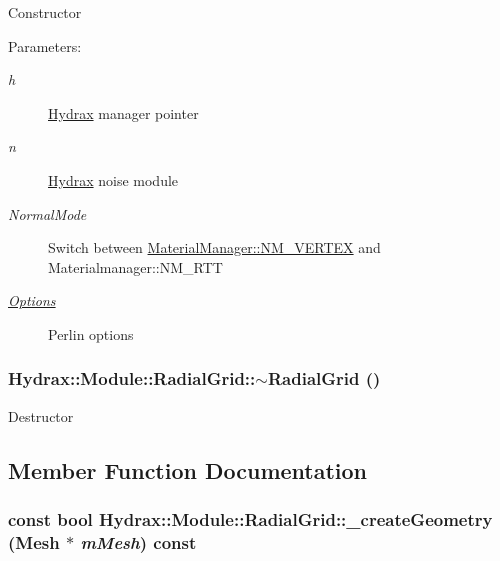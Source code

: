 Constructor \begin{Desc}
\item[Parameters:]
\begin{description}
\item[{\em h}]\hyperlink{class_hydrax_1_1_hydrax}{Hydrax} manager pointer \item[{\em n}]\hyperlink{class_hydrax_1_1_hydrax}{Hydrax} noise module \item[{\em NormalMode}]Switch between \hyperlink{class_hydrax_1_1_material_manager_aa14689cd1c259f48954dfecda9b296ffe4d6257f673cf503a9905fb2576288f}{MaterialManager::NM\_\-VERTEX} and Materialmanager::NM\_\-RTT \item[{\em \hyperlink{struct_hydrax_1_1_module_1_1_radial_grid_1_1_options}{Options}}]Perlin options \end{description}
\end{Desc}
\hypertarget{class_hydrax_1_1_module_1_1_radial_grid_f8caf3997cfc178019db4ac735394b7c}{
\subsubsection[{$\sim$RadialGrid}]{\setlength{\rightskip}{0pt plus 5cm}Hydrax::Module::RadialGrid::$\sim$RadialGrid ()}}
\label{class_hydrax_1_1_module_1_1_radial_grid_f8caf3997cfc178019db4ac735394b7c}


Destructor 

\subsection{Member Function Documentation}
\hypertarget{class_hydrax_1_1_module_1_1_radial_grid_8fde866e72e871e7aaf76957236b7b15}{
\subsubsection[{\_\-createGeometry}]{\setlength{\rightskip}{0pt plus 5cm}const bool Hydrax::Module::RadialGrid::\_\-createGeometry ({\bf Mesh} $\ast$ {\em mMesh}) const}}
\label{class_hydrax_1_1_module_1_1_radial_grid_8fde866e72e871e7aaf76957236b7b15}


